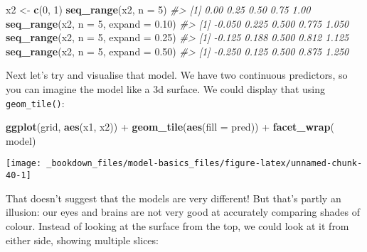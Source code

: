 \documentclass[]{book}
\newenvironment{Shaded}{\begin{snugshade}}{\end{snugshade}}
\newcommand{\KeywordTok}[1]{\textcolor[rgb]{0.13,0.29,0.53}{\textbf{{#1}}}}
\newcommand{\DataTypeTok}[1]{\textcolor[rgb]{0.13,0.29,0.53}{{#1}}}
\newcommand{\DecValTok}[1]{\textcolor[rgb]{0.00,0.00,0.81}{{#1}}}
\newcommand{\FloatTok}[1]{\textcolor[rgb]{0.00,0.00,0.81}{{#1}}}
\newcommand{\StringTok}[1]{\textcolor[rgb]{0.31,0.60,0.02}{{#1}}}
\newcommand{\CommentTok}[1]{\textcolor[rgb]{0.56,0.35,0.01}{\textit{{#1}}}}
\newcommand{\NormalTok}[1]{{#1}}
\begin{document}
\begin{itemize}
\begin{Shaded}
\begin{Highlighting}[]
\NormalTok{x2 <-}\StringTok{ }\KeywordTok{c}\NormalTok{(}\DecValTok{0}\NormalTok{, }\DecValTok{1}\NormalTok{)}
\KeywordTok{seq_range}\NormalTok{(x2, }\DataTypeTok{n =} \DecValTok{5}\NormalTok{)}
\CommentTok{#> [1] 0.00 0.25 0.50 0.75 1.00}
\KeywordTok{seq_range}\NormalTok{(x2, }\DataTypeTok{n =} \DecValTok{5}\NormalTok{, }\DataTypeTok{expand =} \FloatTok{0.10}\NormalTok{)}
\CommentTok{#> [1] -0.050  0.225  0.500  0.775  1.050}
\KeywordTok{seq_range}\NormalTok{(x2, }\DataTypeTok{n =} \DecValTok{5}\NormalTok{, }\DataTypeTok{expand =} \FloatTok{0.25}\NormalTok{)}
\CommentTok{#> [1] -0.125  0.188  0.500  0.812  1.125}
\KeywordTok{seq_range}\NormalTok{(x2, }\DataTypeTok{n =} \DecValTok{5}\NormalTok{, }\DataTypeTok{expand =} \FloatTok{0.50}\NormalTok{)}
\CommentTok{#> [1] -0.250  0.125  0.500  0.875  1.250}
\end{Highlighting}
\end{Shaded}
\end{itemize}

Next let's try and visualise that model. We have two continuous
predictors, so you can imagine the model like a 3d surface. We could
display that using \texttt{geom\_tile()}:

\begin{Shaded}
\begin{Highlighting}[]
\KeywordTok{ggplot}\NormalTok{(grid, }\KeywordTok{aes}\NormalTok{(x1, x2)) +}\StringTok{ }
\StringTok{  }\KeywordTok{geom_tile}\NormalTok{(}\KeywordTok{aes}\NormalTok{(}\DataTypeTok{fill =} \NormalTok{pred)) +}\StringTok{ }
\StringTok{  }\KeywordTok{facet_wrap}\NormalTok{(~}\StringTok{ }\NormalTok{model)}
\end{Highlighting}
\end{Shaded}

\begin{center}\texttt{[image: \_bookdown\_files/model-basics\_files/figure-latex/unnamed-chunk-40-1]} \end{center}

That doesn't suggest that the models are very different! But that's
partly an illusion: our eyes and brains are not very good at accurately
comparing shades of colour. Instead of looking at the surface from the
top, we could look at it from either side, showing multiple slices:
\end{document}
